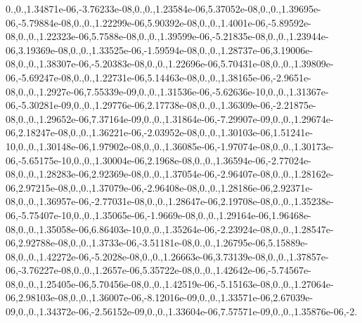 \begin{DoxyCompactItemize}
0.,0.,1.\-34871e-\/06,-\/3.\-76233e-\/08,0.,0.,1.\-23584e-\/06,5.\-37052e-\/08,0.,0.,1.\-39695e-\/06,-\/5.\-79884e-\/08,0.,0.,1.\-22299e-\/06,5.\-90392e-\/08,0.,0.,1.\-4001e-\/06,-\/5.\-89592e-\/08,0.,0.,1.\-22323e-\/06,5.\-7588e-\/08,0.,0.,1.\-39599e-\/06,-\/5.\-21835e-\/08,0.,0.,1.\-23944e-\/06,3.\-19369e-\/08,0.,0.,1.\-33525e-\/06,-\/1.\-59594e-\/08,0.,0.,1.\-28737e-\/06,3.\-19006e-\/08,0.,0.,1.\-38307e-\/06,-\/5.\-20383e-\/08,0.,0.,1.\-22696e-\/06,5.\-70431e-\/08,0.,0.,1.\-39809e-\/06,-\/5.\-69247e-\/08,0.,0.,1.\-22731e-\/06,5.\-14463e-\/08,0.,0.,1.\-38165e-\/06,-\/2.\-9651e-\/08,0.,0.,1.\-2927e-\/06,7.\-55339e-\/09,0.,0.,1.\-31536e-\/06,-\/5.\-62636e-\/10,0.,0.,1.\-31367e-\/06,-\/5.\-30281e-\/09,0.,0.,1.\-29776e-\/06,2.\-17738e-\/08,0.,0.,1.\-36309e-\/06,-\/2.\-21875e-\/08,0.,0.,1.\-29652e-\/06,7.\-37164e-\/09,0.,0.,1.\-31864e-\/06,-\/7.\-29907e-\/09,0.,0.,1.\-29674e-\/06,2.\-18247e-\/08,0.,0.,1.\-36221e-\/06,-\/2.\-03952e-\/08,0.,0.,1.\-30103e-\/06,1.\-51241e-\/10,0.,0.,1.\-30148e-\/06,1.\-97902e-\/08,0.,0.,1.\-36085e-\/06,-\/1.\-97074e-\/08,0.,0.,1.\-30173e-\/06,-\/5.\-65175e-\/10,0.,0.,1.\-30004e-\/06,2.\-1968e-\/08,0.,0.,1.\-36594e-\/06,-\/2.\-77024e-\/08,0.,0.,1.\-28283e-\/06,2.\-92369e-\/08,0.,0.,1.\-37054e-\/06,-\/2.\-96407e-\/08,0.,0.,1.\-28162e-\/06,2.\-97215e-\/08,0.,0.,1.\-37079e-\/06,-\/2.\-96408e-\/08,0.,0.,1.\-28186e-\/06,2.\-92371e-\/08,0.,0.,1.\-36957e-\/06,-\/2.\-77031e-\/08,0.,0.,1.\-28647e-\/06,2.\-19708e-\/08,0.,0.,1.\-35238e-\/06,-\/5.\-75407e-\/10,0.,0.,1.\-35065e-\/06,-\/1.\-9669e-\/08,0.,0.,1.\-29164e-\/06,1.\-96468e-\/08,0.,0.,1.\-35058e-\/06,6.\-86403e-\/10,0.,0.,1.\-35264e-\/06,-\/2.\-23924e-\/08,0.,0.,1.\-28547e-\/06,2.\-92788e-\/08,0.,0.,1.\-3733e-\/06,-\/3.\-51181e-\/08,0.,0.,1.\-26795e-\/06,5.\-15889e-\/08,0.,0.,1.\-42272e-\/06,-\/5.\-2028e-\/08,0.,0.,1.\-26663e-\/06,3.\-73139e-\/08,0.,0.,1.\-37857e-\/06,-\/3.\-76227e-\/08,0.,0.,1.\-2657e-\/06,5.\-35722e-\/08,0.,0.,1.\-42642e-\/06,-\/5.\-74567e-\/08,0.,0.,1.\-25405e-\/06,5.\-70456e-\/08,0.,0.,1.\-42519e-\/06,-\/5.\-15163e-\/08,0.,0.,1.\-27064e-\/06,2.\-98103e-\/08,0.,0.,1.\-36007e-\/06,-\/8.\-12016e-\/09,0.,0.,1.\-33571e-\/06,2.\-67039e-\/09,0.,0.,1.\-34372e-\/06,-\/2.\-56152e-\/09,0.,0.,1.\-33604e-\/06,7.\-57571e-\/09,0.,0.,1.\-35876e-\/06,-\/2.
\end{DoxyCompactItemize}
